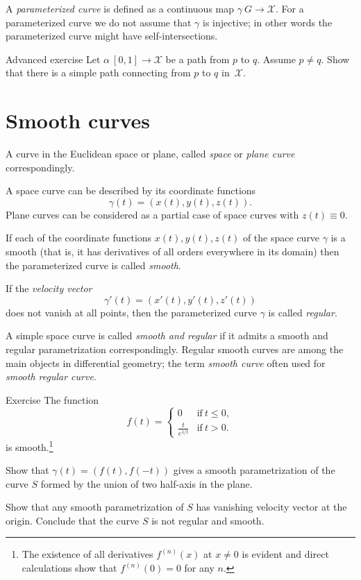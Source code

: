 A \emph{parameterized curve} is defined as a continuous map $\gamma\: G\to \mathcal{X}$. 
For a parameterized curve we do not assume that $\gamma$ is injective; in other words the parameterized curve might have self-intersections.

\begin{thm}{Advanced exercise}
Let $\alpha\:[0,1]\to\mathcal{X}$ be a path from $p$ to $q$.
Assume $p\ne q$.
Show that there is a simple path connecting from $p$ to $q$ in~$\mathcal{X}$.
\end{thm}

\section*{Smooth curves}

A curve in the Euclidean space or plane, called \emph{space} or \emph{plane curve} correspondingly.

A space curve can be described by its coordinate functions 
\[\gamma(t)=(x(t),y(t),z(t)).\]
Plane curves can be considered as a partial case of space curves with $z(t)\equiv 0$.

If each of the coordinate functions $x(t),y(t),z(t)$ of the space curve $\gamma$ is a smooth (that is, it has derivatives of all orders everywhere in its domain) then the parameterized curve is called \emph{smooth}.

If the \emph{velocity vector} 
\[\gamma'(t)=(x'(t),y'(t),z'(t))\] 
does not vanish at all points, then the parameterized curve $\gamma$ is called \emph{regular}.

A simple space curve is called \emph{smooth and regular} if it admits a smooth and regular parametrization correspondingly.
Regular smooth curves are among the main objects in differential geometry;
the term \emph{smooth curve} often used for \emph{smooth regular curve}. 

\begin{thm}{Exercise}\label{ex:L-shape}
The function 
\[f(t)=
\begin{cases}
0&\text{if}\ t\le 0,
\\
\frac{t}{e^{1\!/\!t}}&\text{if}\ t> 0.
\end{cases}
\]
is smooth.\footnote{The existence of all derivatives $f^{(n)}(x)$ at $x\ne 0$ is evident and direct calculations show that $f^{(n)}(0)=0$ for any $n$.}

Show that $\gamma(t)=(f(t),f(-t))$ gives a smooth parametrization of the curve $S$ formed by the union of two half-axis in the plane.

Show that any smooth parametrization of $S$ has vanishing velocity vector at the origin.
Conclude that the curve $S$ is not regular and smooth.
\end{thm}


